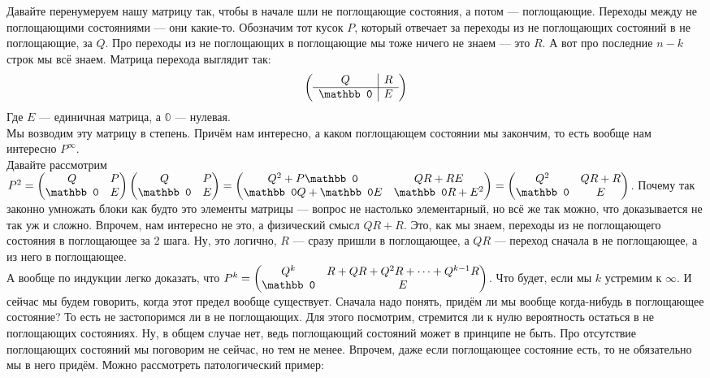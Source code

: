 \documentclass{article}
\begin{document}
\begin{itemize}
\begin{Comment}
        \end{Comment}
        \begin{Comment}
            Давайте перенумеруем нашу матрицу так, чтобы в начале шли не поглощающие состояния, а потом --- поглощающие. Переходы между не поглощающими состояниями --- они какие-то. Обозначим тот кусок $P$, который отвечает за переходы из не поглощающих состояний в не поглощающие, за $Q$. Про переходы из не поглощающих в поглощающие мы тоже ничего не знаем --- это $R$. А вот про последние $n-k$ строк мы всё знаем. Матрица перехода выглядит так:
            $$
            \arr{c|c}{
                Q & R\\
                \hline
                \mathbb0 & E
            }
            $$
            Где $E$ --- единичная матрица, а $\mathbb0$ --- нулевая.\\
            Мы возводим эту матрицу в степень. Причём нам интересно, а каком поглощающем состоянии мы закончим, то есть вообще нам интересно $P^\infty$.\\
            Давайте рассмотрим $P^2=\matr{Q&P\\\mathbb0&E}\matr{Q&P\\\mathbb0&E}=\matr{Q^2+P\mathbb0 & QR+RE \\\mathbb0Q+\mathbb0E & \mathbb0R+E^2}=\matr{Q^2 & QR+R\\\mathbb0 & E}$. Почему так законно умножать блоки как будто это элементы матрицы --- вопрос не настолько элементарный, но всё же так можно, что доказывается не так уж и сложно. Впрочем, нам интересно не это, а физический смысл $QR+R$. Это, как мы знаем, переходы из не поглощающего состояния в поглощающее за 2 шага. Ну, это логично, $R$ --- сразу пришли в поглощающее, а $QR$ --- переход сначала в не поглощающее, а из него в поглощающее.\\
            А вообще по индукции легко доказать, что $P^k=\matr{Q^k & R+QR+Q^2R+\cdots+Q^{k-1}R\\\mathbb0 & E}$. Что будет, если мы $k$ устремим к $\infty$. И сейчас мы будем говорить, когда этот предел вообще существует. Сначала надо понять, придём ли мы вообще когда-нибудь в поглощающее состояние? То есть не застопоримся ли в не поглощающих. Для этого посмотрим, стремится ли к нулю вероятность остаться в не поглощающих состояниях. Ну, в общем случае нет, ведь поглощающий состояний может в принципе не быть. Про отсутствие поглощающих состояний мы поговорим не сейчас, но тем не менее. Впрочем, даже если поглощающее состояние есть, то не обязательно мы в него придём. Можно рассмотреть патологический пример:

\end{Comment}
\end{itemize}
\end{document}
